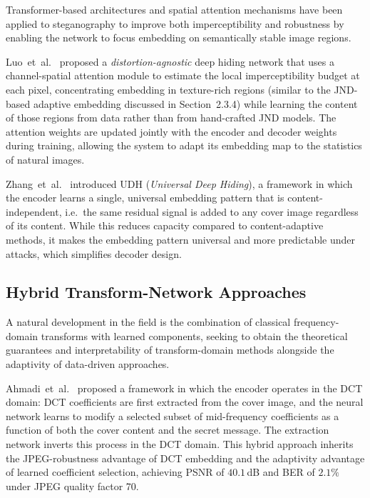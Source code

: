 \documentclass[12pt,a4paper,oneside]{report}
\begin{document}
	Transformer-based architectures and spatial attention mechanisms have been applied to
	steganography to improve both imperceptibility and robustness by enabling the network to
	focus embedding on semantically stable image regions.
	
	Luo~et~al.\ \cite{luo2020distortion} proposed a \emph{distortion-agnostic} deep hiding network
	that uses a channel-spatial attention module to estimate the local imperceptibility budget at each
	pixel, concentrating embedding in texture-rich regions (similar to the JND-based adaptive
	embedding discussed in Section~2.3.4) while learning the content of those regions from data
	rather than from hand-crafted JND models. The attention weights are updated jointly with the
	encoder and decoder weights during training, allowing the system to adapt its embedding map
	to the statistics of natural images.
	
	Zhang~et~al.\ \cite{zhang2020udh} introduced UDH (\textit{Universal Deep Hiding}), a framework
	in which the encoder learns a single, universal embedding pattern that is content-independent,
	i.e.\ the same residual signal is added to any cover image regardless of its content. While
	this reduces capacity compared to content-adaptive methods, it makes the embedding pattern
	universal and more predictable under attacks, which simplifies decoder design.
	
	\subsection{Hybrid Transform-Network Approaches}
	\label{subsec:hybrid}
	
	A natural development in the field is the combination of classical frequency-domain transforms
	with learned components, seeking to obtain the theoretical guarantees and interpretability of
	transform-domain methods alongside the adaptivity of data-driven approaches.
	
	Ahmadi~et~al.\ \cite{ahmadi2020redmark} proposed a framework in which the encoder operates
	in the DCT domain: DCT coefficients are first extracted from the cover image, and the neural
	network learns to modify a selected subset of mid-frequency coefficients as a function of both
	the cover content and the secret message. The extraction network inverts this process in the
	DCT domain. This hybrid approach inherits the JPEG-robustness advantage of DCT embedding and
	the adaptivity advantage of learned coefficient selection, achieving PSNR of $40.1$\,dB and
	BER of $2.1\%$ under JPEG quality factor 70.
	
\end{document}
